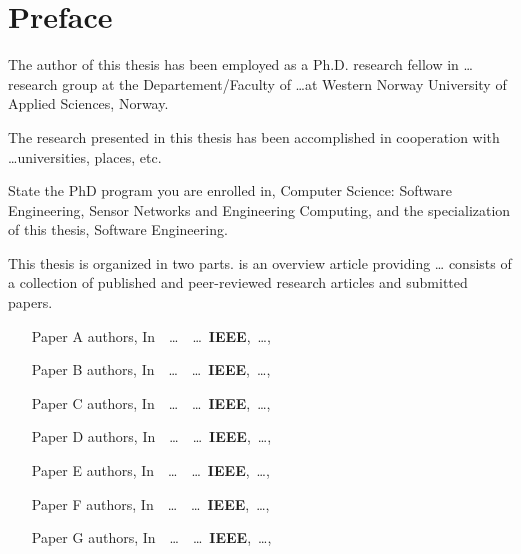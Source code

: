 \chapter{Preface}
\label{preface}
The author of this thesis has been employed as a Ph.D. research fellow in \ldots
research group at the Departement/Faculty of \ldots at Western Norway 
University of Applied Sciences, Norway.

The research presented in this thesis has been accomplished in cooperation with
\ldots universities, places, etc. 

State the PhD program you are enrolled in, \eg Computer Science: 
Software Engineering, Sensor Networks and Engineering Computing, and the
specialization of this thesis, \eg Software Engineering.

This thesis is organized in two parts.
 is an overview article providing \ldots 
{} consists of a collection of published and peer-reviewed
research articles and submitted papers. 

\begin{enumerate}
\item[\color{Maroon}Paper A]\mbox{} authors,
In~\Proc~\ldots~\IntlConf~\ldots~\textbf{IEEE},~\ldots,~\date{month day, year}  

\item[\color{Maroon}Paper B]\mbox{} authors,
In~\Proc~\ldots~\IntlConf~\ldots~\textbf{IEEE},~\ldots,~\date{month day, year}  

\item[\color{Maroon}Paper C]\mbox{} authors,
In~\Proc~\ldots~\IntlConf~\ldots~\textbf{IEEE},~\ldots,~\date{month day, year}  

\item[\color{Maroon}Paper D]\mbox{} authors,
In~\Proc~\ldots~\IntlConf~\ldots~\textbf{IEEE},~\ldots,~\date{month day, year}  

\item[\color{Maroon}Paper E]\mbox{} authors,
In~\Proc~\ldots~\IntlConf~\ldots~\textbf{IEEE},~\ldots,~\date{month day, year}  

\item[\color{Maroon}Paper F]\mbox{} authors,
In~\Proc~\ldots~\IntlConf~\ldots~\textbf{IEEE},~\ldots,~\date{month day, year}  

\item[\color{Maroon}Paper G]\mbox{} authors,
In~\Proc~\ldots~\IntlConf~\ldots~\textbf{IEEE},~\ldots,~\date{month day, year}  
\end{enumerate}
